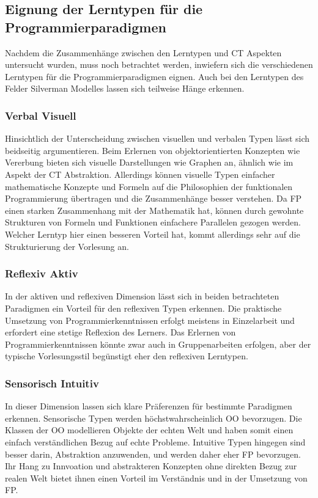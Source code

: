 \subsection{Eignung der Lerntypen für die Programmierparadigmen}
Nachdem die Zusammenhänge zwischen den Lerntypen und CT Aspekten untersucht wurden, muss noch betrachtet werden, inwiefern sich die verschiedenen Lerntypen für die Programmierparadigmen eignen.
Auch bei den Lerntypen des Felder Silverman Modelles lassen sich teilweise Hänge erkennen.

\subsubsection{Verbal Visuell}
Hinsichtlich der Unterscheidung zwischen visuellen und verbalen Typen lässt sich beidseitig argumentieren. Beim Erlernen von objektorientierten Konzepten wie Vererbung bieten sich visuelle Darstellungen wie Graphen an, ähnlich wie im Aspekt der CT Abstraktion.
Allerdings können visuelle Typen einfacher mathematische Konzepte und Formeln auf die Philosophien der funktionalen Programmierung übertragen und die Zusammenhänge besser verstehen. Da FP einen starken Zusammenhang mit der Mathematik hat, können durch gewohnte Strukturen von Formeln und Funktionen einfachere Parallelen gezogen werden.
Welcher Lerntyp hier einen besseren Vorteil hat, kommt allerdings sehr auf die Strukturierung der Vorlesung an.

\subsubsection{Reflexiv Aktiv}
In der aktiven und reflexiven Dimension lässt sich in beiden betrachteten Paradigmen ein Vorteil für den reflexiven Typen erkennen. Die praktische Umsetzung von Programmierkenntnissen erfolgt meistens in Einzelarbeit und erfordert eine stetige Reflexion des Lerners.
Das Erlernen von Programmierkenntnissen könnte zwar auch in Gruppenarbeiten erfolgen, aber der typische Vorlesungsstil begünstigt eher den reflexiven Lerntypen.

\subsubsection{Sensorisch Intuitiv}
In dieser Dimension lassen sich klare Präferenzen für bestimmte Paradigmen erkennen. Sensorische Typen werden höchstwahrscheinlich OO bevorzugen. Die Klassen der OO modellieren Objekte der echten Welt und haben somit einen einfach verständlichen Bezug auf echte Probleme.
Intuitive Typen hingegen sind besser darin, Abstraktion anzuwenden, und werden daher eher FP bevorzugen.
Ihr Hang zu Innvoation und abstrakteren Konzepten ohne direkten Bezug zur realen Welt bietet ihnen einen Vorteil im Verständnis und in der Umsetzung von FP.

